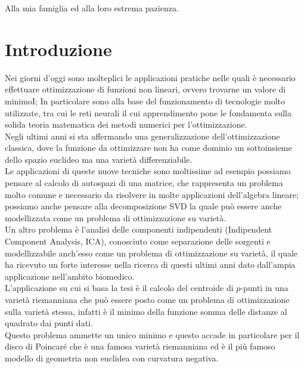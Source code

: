 \documentclass[a4paper, 12pt]{article}
\begin{document}
\clearpage
\begin{center}
    \thispagestyle{empty}
    \vspace*{\fill}
    Alla mia famiglia ed alla loro estrema pazienza.
    \vspace*{\fill}
\end{center}
\clearpage


\newpage

\renewcommand{\contentsname}{Contenuti}
\tableofcontents

\newpage

\section{Introduzione}
Nei giorni d'oggi sono molteplici le applicazioni pratiche nelle quali è necessario effettuare ottimizzazione di funzioni non lineari, ovvero trovarne un valore di minimoI; In particolare sono alla base del funzionamento di tecnologie molto utilizzate, tra cui le reti neurali il cui apprendimento pone le fondamenta sulla solida teoria matematica dei metodi numerici per l'ottimizzazione.\\
Negli ultimi anni si sta affermando una generalizzazione dell'ottimizzazione classica, dove la funzione da ottimizzare non ha come dominio un sottoinsieme dello spazio euclideo ma una varietà differenziabile.\\
Le applicazioni di queste nuove tecniche sono moltissime ad esempio possiamo pensare al calcolo di autospazi di una matrice, che rappresenta un problema molto comune e necessario da risolvere in molte applicazioni dell'algebra lineare; possiamo anche pensare alla decomposizione SVD la quale può essere anche modellizzata come un problema di ottimizzazione su varietà.\\
Un altro problema è l'analisi delle componenti indipendenti (Indipendent Component Analysis, ICA), conosciuto come separazione delle sorgenti e modellizzabile anch'esso come un problema di ottimizzazione su varietà, il quale ha ricevuto un forte interesse nella ricerca di questi ultimi anni dato dall'ampia applicazione nell'ambito biomedico.\\
L'applicazione su cui si basa la tesi è il calcolo del centroide di $p$-punti in una varietà riemanniana che può essere posto come un problema di ottimizzazione sulla varietà stessa, infatti è il minimo della funzione somma delle distanze al quadrato dai punti dati.\\
Questo problema ammette un unico minimo e questo accade in particolare per il disco di Poincaré che è una famosa varietà riemanniana ed è il più famoso modello di geometria non euclidea con curvatura negativa.\\
\end{document}
